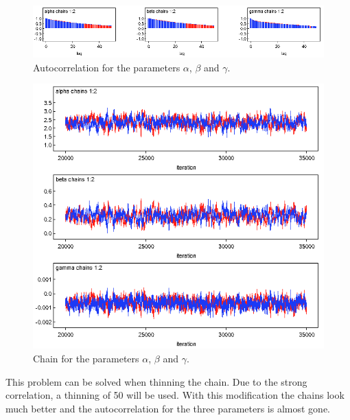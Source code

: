 \documentclass{article}
\begin{document}
  \begin{figure}[ht!]
  \centering
  \includegraphics[width=1\textwidth]{Figures/1.png}
  \caption{Autocorrelation for the parameters $\alpha$, $\beta$ and $\gamma$.}
  \label{fig:fig1}
  \end{figure}
  
  \begin{figure}[ht!]
  \centering
  \includegraphics[width=.75\textwidth]{Figures/2.png}
  \caption{Chain for the parameters $\alpha$, $\beta$ and $\gamma$.}
  \label{fig:fig2}
  \end{figure}

This problem can be solved when thinning the chain. Due to the strong correlation, a thinning of 50 will be used. With this modification the chains look much better and the autocorrelation for the three parameters is almost gone. 
\end{document}
